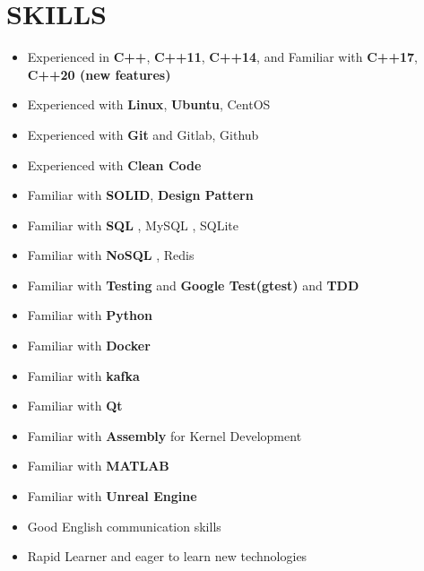 \documentclass[11pt,a4paper,roman]{moderncv}
\begin{document}
\section{SKILLS}
\begin{minipage}{\maincolumnwidth}%
  \small{
      \begin{itemize}
	  \item Experienced  in \textbf{C++}, \textbf{C++11}, \textbf{C++14}, and Familiar with \textbf{C++17}, \textbf{C++20 (new features)}
          \item Experienced with \textbf{Linux}, \textbf{Ubuntu}, CentOS
          \item Experienced with \textbf{Git} and Gitlab, Github
	  \item Experienced with \textbf{Clean Code}
	  \item Familiar with \textbf{SOLID}, \textbf{Design Pattern}
    \item Familiar with \textbf{SQL} , MySQL , SQLite
    \item Familiar with \textbf{NoSQL} , Redis
	  \item Familiar with \textbf{Testing} and \textbf{Google Test(gtest)} and \textbf{TDD}
	  \item Familiar with \textbf{Python}
	  \item Familiar with \textbf{Docker}
	  \item Familiar with \textbf{kafka}
	  \item Familiar with \textbf{Qt}
    \item Familiar with \textbf{Assembly} for Kernel Development
	  \item Familiar with \textbf{MATLAB}
	  \item Familiar with \textbf{Unreal Engine}
          \item Good English communication skills
          \item Rapid Learner and eager to learn new technologies
    \end{itemize}}%
\end{minipage}%
      


\nocite{*}

 
\end{document}

